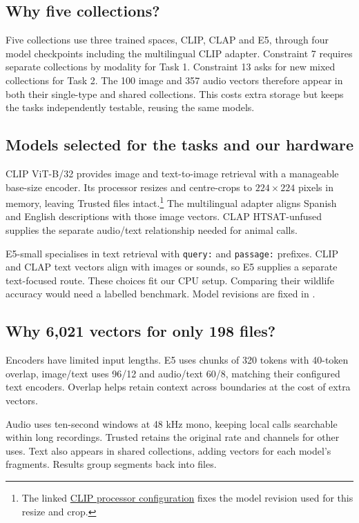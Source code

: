 \documentclass[10pt,a4paper]{article}
\begin{document}
\subsection*{Why five collections?}
Five collections use three trained spaces, CLIP, CLAP and E5, through four model checkpoints including the multilingual CLIP adapter. Constraint 7 requires separate collections by modality for Task 1. Constraint 13 asks for new mixed collections for Task 2. The 100 image and 357 audio vectors therefore appear in both their single-type and shared collections. This costs extra storage but keeps the tasks independently testable, reusing the same models.

\subsection*{Models selected for the tasks and our hardware}
CLIP ViT-B/32 provides image and text-to-image retrieval with a manageable base-size encoder. Its processor resizes and centre-crops to $224\times224$ pixels in memory, leaving Trusted files intact.\footnote{The linked \href{https://huggingface.co/sentence-transformers/clip-ViT-B-32/blob/327ab6726d33c0e22f920c83f2ff9e4bd38ca37f/0_CLIPModel/preprocessor_config.json}{CLIP processor configuration} fixes the model revision used for this resize and crop.} The multilingual adapter aligns Spanish and English descriptions with those image vectors. CLAP HTSAT-unfused supplies the separate audio/text relationship needed for animal calls.

E5-small specialises in text retrieval with \texttt{query:} and \texttt{passage:} prefixes. CLIP and CLAP text vectors align with images or sounds, so E5 supplies a separate text-focused route. These choices fit our CPU setup. Comparing their wildlife accuracy would need a labelled benchmark. Model revisions are fixed in .

\subsection*{Why 6,021 vectors for only 198 files?}
Encoders have limited input lengths. E5 uses chunks of 320 tokens with 40-token overlap, image/text uses 96/12 and audio/text 60/8, matching their configured text encoders. Overlap helps retain context across boundaries at the cost of extra vectors.

Audio uses ten-second windows at 48 kHz mono, keeping local calls searchable within long recordings. Trusted retains the original rate and channels for other uses. Text also appears in shared collections, adding vectors for each model's fragments. Results group segments back into files.
\end{document}
